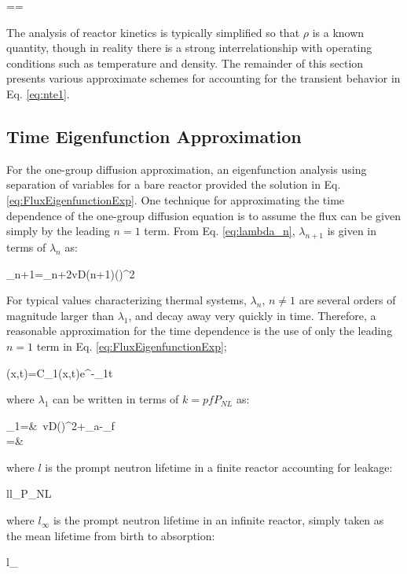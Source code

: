 \beq
\label{eq:Reactivity}
\rho==
\eeq

The analysis of reactor kinetics is typically simplified so that \(\rho\) is a known quantity, though in reality there is a strong interrelationship with operating conditions such as temperature and density. The remainder of this section presents various approximate schemes for accounting for the transient behavior in Eq. \eqref{eq:nte1}.

\subsection{Time Eigenfunction Approximation}

For the one-group diffusion approximation, an eigenfunction analysis using separation of variables for a bare reactor provided the solution in Eq. \eqref{eq:FluxEigenfunctionExp}. One technique for approximating the time dependence of the one-group diffusion equation is to assume the flux can be given simply by the leading \(n=1\) term. From Eq. \eqref{eq:lambda_n}, \(\lambda_{n+1}\) is given in terms of \(\lambda_n\) as:

\beq
\lambda_{n+1}=\lambda_n+2vD(n+1)\left(\right)^2
\eeq

For typical values characterizing thermal systems, \(\lambda_{n}\), \(n\neq1\) are several orders of magnitude larger than \(\lambda_1\), and decay away very quickly in time. Therefore, a reasonable approximation for the time dependence is the use of only the leading \(n=1\) term in Eq. \eqref{eq:FluxEigenfunctionExp};

\beq
\phi(x,t)=C_1(x,t)e^{-\lambda_1t}
\eeq

where \(\lambda_1\) can be written in terms of \(k=pfP_{NL}\) as:

\beqa
\lambda_1=&\ v\left\lbrack D\left(\right)^2+\Sigma_a-\nu\Sigma_f\right\rbrack\\
=&\ 
\eeqa

where \(l\) is the prompt neutron lifetime in a finite reactor accounting for leakage:

\beq
l\equiv l_\infty P_{NL}
\eeq

where \(l_\infty\) is the prompt neutron lifetime in an infinite reactor, simply taken as the mean lifetime from birth to absorption:

\beq
l_\infty\equiv{}
\eeq

